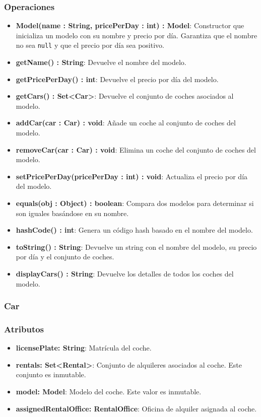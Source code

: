 \subsubsection*{Operaciones}

\begin{itemize}
    \item \textbf{Model(name : String, pricePerDay : int) : Model}: 
    Constructor que inicializa un modelo con su nombre y precio por día. Garantiza que el nombre no sea \texttt{null} y que el precio por día sea positivo.

    \item \textbf{getName() : String}: Devuelve el nombre del modelo.
    \item \textbf{getPricePerDay() : int}: Devuelve el precio por día del modelo.
    \item \textbf{getCars() : Set<Car>}: Devuelve el conjunto de coches asociados al modelo.
    \item \textbf{addCar(car : Car) : void}: Añade un coche al conjunto de coches del modelo. 
    \item \textbf{removeCar(car : Car) : void}: Elimina un coche del conjunto de coches del modelo.
    \item \textbf{setPricePerDay(pricePerDay : int) : void}: Actualiza el precio por día del modelo.
    \item \textbf{equals(obj : Object) : boolean}: Compara dos modelos para determinar si son iguales basándose en su nombre.
    \item \textbf{hashCode() : int}: Genera un código hash basado en el nombre del modelo.
    \item \textbf{toString() : String}: Devuelve un string con el nombre del modelo, su precio por día y el conjunto de coches.
    \item \textbf{displayCars() : String}: Devuelve los detalles de todos los coches del modelo.
\end{itemize}

\subsubsection{Car}

\subsubsection*{Atributos}

\begin{itemize}
    \item \textbf{licensePlate: String}: Matrícula del coche.
    \item \textbf{rentals: Set<Rental>}: Conjunto de alquileres asociados al coche. Este conjunto es inmutable.
    \item \textbf{model: Model}: Modelo del coche. Este valor es inmutable.
    \item \textbf{assignedRentalOffice: RentalOffice}: Oficina de alquiler asignada al coche.
\end{itemize}

